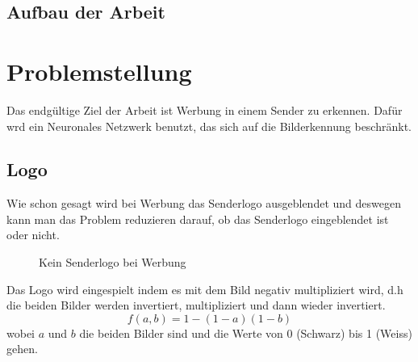 \documentclass[12pt,a4paper]{report}
\begin{document}
\section{Aufbau der Arbeit}
\label{sec:aufbauDerArbeit}

\chapter{Problemstellung}
Das endgültige Ziel der Arbeit ist Werbung in einem Sender zu erkennen.
Dafür wrd ein Neuronales Netzwerk benutzt, das sich auf die Bilderkennung beschränkt.
\section{Logo}
Wie schon gesagt wird bei Werbung das Senderlogo ausgeblendet und deswegen kann man das Problem reduzieren darauf,
ob das Senderlogo eingeblendet ist oder nicht.

\begin{figure}[h]%
    \centering
    \qquad
    \caption{Kein Senderlogo bei Werbung}%
    \label{fig:logo1}%
\end{figure}

Das Logo wird eingespielt indem es mit dem Bild negativ multipliziert wird,
d.h die beiden Bilder werden invertiert, multipliziert und dann wieder invertiert.\cite{wiki:blend}
\[f(a,b) = 1 - (1-a)(1-b)\]
wobei $a$ und $b$ die beiden Bilder sind und die Werte von 0 (Schwarz) bis 1 (Weiss) gehen.
\end{document}
